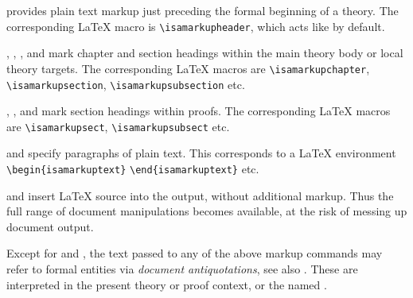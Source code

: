 \begin{isabellebody}
\begin{isamarkuptext}
\begin{description}
  \item \hyperlink{command.header}{\mbox{}} provides plain text markup just preceding
  the formal beginning of a theory.  The corresponding {\LaTeX} macro
  is \verb|\isamarkupheader|, which acts like \hyperlink{command.section}{\mbox{}} by default.
  
  \item \hyperlink{command.chapter}{\mbox{}}, \hyperlink{command.section}{\mbox{}}, \hyperlink{command.subsection}{\mbox{}},
  and \hyperlink{command.subsubsection}{\mbox{}} mark chapter and section headings
  within the main theory body or local theory targets.  The
  corresponding {\LaTeX} macros are \verb|\isamarkupchapter|,
  \verb|\isamarkupsection|, \verb|\isamarkupsubsection| etc.

  \item \hyperlink{command.sect}{\mbox{}}, \hyperlink{command.subsect}{\mbox{}}, and \hyperlink{command.subsubsect}{\mbox{}}
  mark section headings within proofs.  The corresponding {\LaTeX}
  macros are \verb|\isamarkupsect|, \verb|\isamarkupsubsect| etc.

  \item \hyperlink{command.text}{\mbox{}} and \hyperlink{command.txt}{\mbox{}} specify paragraphs of plain
  text.  This corresponds to a {\LaTeX} environment \verb|\begin{isamarkuptext}| \isa{{\isachardoublequote}{\isasymdots}{\isachardoublequote}} \verb|\end{isamarkuptext}| etc.

  \item \hyperlink{command.text-raw}{\mbox{}} and \hyperlink{command.txt-raw}{\mbox{}} insert {\LaTeX}
  source into the output, without additional markup.  Thus the full
  range of document manipulations becomes available, at the risk of
  messing up document output.

  \end{description}

  Except for \hyperlink{command.text-raw}{\mbox{}} and \hyperlink{command.txt-raw}{\mbox{}}, the text
  passed to any of the above markup commands may refer to formal
  entities via \emph{document antiquotations}, see also
  .  These are interpreted in the present theory or
  proof context, or the named .


\end{isamarkuptext}
\end{isabellebody}
